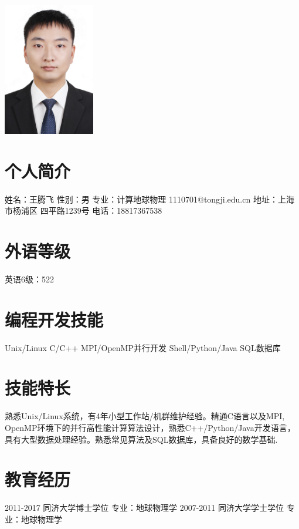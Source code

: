 \documentclass[]{friggeri-cvblackwhite}
\begin{document}
       {}
\begin{aside}
\includegraphics[width=4cm]{IMG_4827small.jpg}
  \section{个人简介}
   姓名：王腾飞 
   性别：男
   专业：计算地球物理
   1110701@tongji.edu.cn
   地址：上海市杨浦区
   四平路1239号
   电话：18817367538
  \section{外语等级}
  英语6级：522
  \section{编程开发技能}
	Unix/Linux
    C/C++
	MPI/OpenMP并行开发
    Shell/Python/Java
	SQL数据库
\end{aside}

\section{技能特长}
\large
熟悉Unix/Linux系统，有4年小型工作站/机群维护经验。精通C语言以及MPI,\\
OpenMP环境下的并行高性能计算算法设计，熟悉C++/Python/Java开发语言，\\
具有大型数据处理经验。熟悉常见算法及SQL数据库，具备良好的数学基础.\\

\section{教育经历}
\begin{entrylist}
  \entryTwo
    {2011-2017}
    {同济大学博士学位 \quad 专业：地球物理学}
  \entryTwo
    {2007-2011}
    {同济大学学士学位 \quad 专业：地球物理学}
\end{entrylist}
\end{document}
